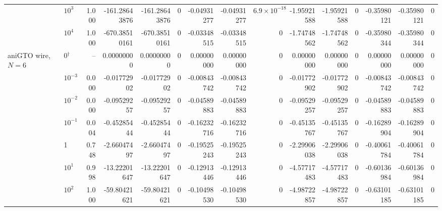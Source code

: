 \begin{tabular}{@{}llr rrr rrr rrr rrr@{}}
 & $10^{3}$ & 1.000 & -161.28643876 & -161.28643876 & \textcolor{green!50!black}{0} & -0.04931277 & -0.04931277 & \textcolor{green!50!black}{$6.9\times10^{-18}$} & -1.95921588 & -1.95921588 & \textcolor{green!50!black}{0} & -0.35980121 & -0.35980121 & \textcolor{green!50!black}{0} \\
 & $10^{4}$ & 1.000 & -670.38510161 & -670.38510161 & \textcolor{green!50!black}{0} & -0.03348515 & -0.03348515 & \textcolor{green!50!black}{0} & -1.74748562 & -1.74748562 & \textcolor{green!50!black}{0} & -0.35980344 & -0.35980344 & \textcolor{green!50!black}{0} \\
\addlinespace
aniGTO wire, $N=6$ & 0$^{\dagger}$ & -- & 0.00000000 & 0.00000000 & \textcolor{green!50!black}{0} & 0.00000000 & 0.00000000 & \textcolor{green!50!black}{0} & 0.00000000 & 0.00000000 & \textcolor{green!50!black}{0} & 0.00000000 & 0.00000000 & \textcolor{green!50!black}{0} \\
 & $10^{-3}$ & 0.000 & -0.01772902 & -0.01772902 & \textcolor{green!50!black}{0} & -0.00843742 & -0.00843742 & \textcolor{green!50!black}{0} & -0.01772902 & -0.01772902 & \textcolor{green!50!black}{0} & -0.00843742 & -0.00843742 & \textcolor{green!50!black}{0} \\
 & $10^{-2}$ & 0.000 & -0.09529257 & -0.09529257 & \textcolor{green!50!black}{0} & -0.04589883 & -0.04589883 & \textcolor{green!50!black}{0} & -0.09529257 & -0.09529257 & \textcolor{green!50!black}{0} & -0.04589883 & -0.04589883 & \textcolor{green!50!black}{0} \\
 & $10^{-1}$ & 0.004 & -0.45285444 & -0.45285444 & \textcolor{green!50!black}{0} & -0.16232716 & -0.16232716 & \textcolor{green!50!black}{0} & -0.45135767 & -0.45135767 & \textcolor{green!50!black}{0} & -0.16289904 & -0.16289904 & \textcolor{green!50!black}{0} \\
 & 1 & 0.748 & -2.66047497 & -2.66047497 & \textcolor{green!50!black}{0} & -0.19525243 & -0.19525243 & \textcolor{green!50!black}{0} & -2.29906038 & -2.29906038 & \textcolor{green!50!black}{0} & -0.40061784 & -0.40061784 & \textcolor{green!50!black}{0} \\
 & $10^{1}$ & 0.998 & -13.22201647 & -13.22201647 & \textcolor{green!50!black}{0} & -0.12913446 & -0.12913446 & \textcolor{green!50!black}{0} & -4.57717483 & -4.57717483 & \textcolor{green!50!black}{0} & -0.60136984 & -0.60136984 & \textcolor{green!50!black}{0} \\
 & $10^{2}$ & 1.000 & -59.80421621 & -59.80421621 & \textcolor{green!50!black}{0} & -0.10498530 & -0.10498530 & \textcolor{green!50!black}{0} & -4.98722857 & -4.98722857 & \textcolor{green!50!black}{0} & -0.63101185 & -0.63101185 & \textcolor{green!50!black}{0} \\

\end{tabular}
